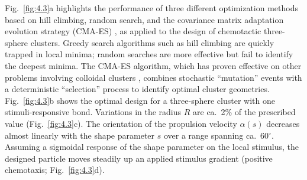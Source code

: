 Fig.\ \ref{fig:4.3}a highlights the performance of three different optimization methods based on hill climbing, random search, and the covariance matrix adaptation evolution strategy (CMA-ES) \cite{hansen2016cma}, as applied to the design of chemotactic three-sphere clusters.  Greedy search algorithms such as hill climbing are quickly trapped in local minima; random searches are more effective but fail to identify the deepest minima.  The CMA-ES algorithm, which has proven effective on other problems involving colloidal clusters \cite{miskin2013adapting}, combines stochastic ``mutation'' events with a deterministic ``selection'' process to identify optimal cluster geometries.  Fig.\ \ref{fig:4.3}b shows the optimal design for a three-sphere cluster with one stimuli-responsive bond.  Variations in the radius $R$ are ca.\ 2\% of the prescribed value (Fig.\ \ref{fig:4.3}c).  The orientation of the propulsion velocity $\alpha(s)$ decreases almost linearly with the shape parameter $s$ over a range spanning ca.\ 60$^{\circ}$. Assuming a sigmoidal response of the shape parameter on the local stimulus, the designed particle moves steadily up an applied stimulus gradient (positive chemotaxis; Fig.\ \ref{fig:4.3}d).

